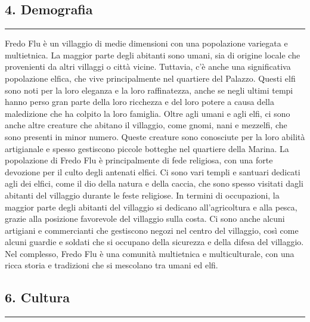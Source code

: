 \subsection{4. Demografia}\label{demografia}

\begin{center}\rule{0.5\linewidth}{0.5pt}\end{center}

Fredo Flu è un villaggio di medie dimensioni con una popolazione
variegata e multietnica. La maggior parte degli abitanti sono umani, sia
di origine locale che provenienti da altri villaggi o città vicine.
Tuttavia, c'è anche una significativa popolazione elfica, che vive
principalmente nel quartiere del Palazzo. Questi elfi sono noti per la
loro eleganza e la loro raffinatezza, anche se negli ultimi tempi hanno
perso gran parte della loro ricchezza e del loro potere a causa della
maledizione che ha colpito la loro famiglia. Oltre agli umani e agli
elfi, ci sono anche altre creature che abitano il villaggio, come gnomi,
nani e mezzelfi, che sono presenti in minor numero. Queste creature sono
conosciute per la loro abilità artigianale e spesso gestiscono piccole
botteghe nel quartiere della Marina. La popolazione di Fredo Flu è
principalmente di fede religiosa, con una forte devozione per il culto
degli antenati elfici. Ci sono vari templi e santuari dedicati agli dei
elfici, come il dio della natura e della caccia, che sono spesso
visitati dagli abitanti del villaggio durante le feste religiose. In
termini di occupazioni, la maggior parte degli abitanti del villaggio si
dedicano all'agricoltura e alla pesca, grazie alla posizione favorevole
del villaggio sulla costa. Ci sono anche alcuni artigiani e commercianti
che gestiscono negozi nel centro del villaggio, così come alcuni guardie
e soldati che si occupano della sicurezza e della difesa del villaggio.
Nel complesso, Fredo Flu è una comunità multietnica e multiculturale,
con una ricca storia e tradizioni che si mescolano tra umani ed elfi.

\subsection{6. Cultura}\label{cultura}

\begin{center}\rule{0.5\linewidth}{0.5pt}\end{center}

